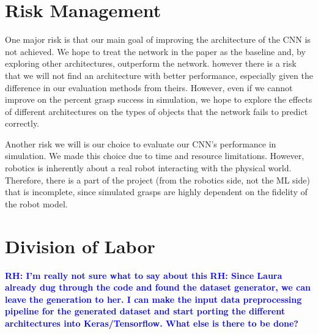 \documentclass[letterpaper, 10 pt]{article}
\newcommand{\rhnote}[1]{\ifthenelse{\boolean{include-notes}}%
 {\textcolor{blue}{\textbf{RH: #1}}}{}}
\begin{document}
\section{Risk Management}

One major risk is that our main goal of improving the architecture of the CNN is not achieved. We hope to treat the network in the paper as the baseline and, by exploring other architectures, outperform the network. however there is a risk that we will not find an architecture with better performance, especially given the difference in our evaluation methods from theirs. However, even if we cannot improve on the percent grasp success in simulation, we hope to explore the effects of different architectures on the types of objects that the network fails to predict correctly. 

Another risk we will is our choice to evaluate our CNN's performance in simulation. We made this choice due to time and resource limitations. However, robotics is inherently about a real robot interacting with the physical world. Therefore, there is a part of the project (from the robotics side, not the ML side) that is incomplete, since simulated grasps are highly dependent on the fidelity of the robot model.

\section{Division of Labor}

\rhnote{I'm really not sure what to say about this}
\rhnote{Since Laura already dug through the code and found the dataset generator, we can leave the generation to her. I can make the input data preprocessing pipeline for the generated dataset and start porting the different architectures into Keras/Tensorflow. What else is there to be done?}


{\footnotesize
    
}
\end{document}
